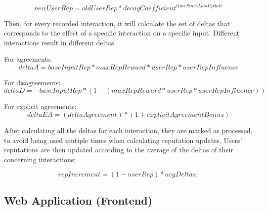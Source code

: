 \begin{equation}
    newUserRep = oldUserRep * decayCoefficient^{timeSinceLastUpdate}
\end{equation}

Then, for every recorded interaction, it will calculate the set of deltas that corresponds to the effect of a specific interaction on a specific input. Different interactions result in different deltas.

For agreements:
\begin{equation}
    deltaA = baseInputRep * maxRepReward * userRep * userRepInfluence
\end{equation}

For disagreements:
\begin{equation}
    deltaD = -baseInputRep * (1 - (maxRepReward * userRep * userRepInfluence))
\end{equation}

For explicit agreements:
\begin{equation}
    deltaEA = (deltaAgreement) * (1 + explicitAgreementBonus)
\end{equation}

After calculating all the deltas for each interaction, they are marked as processed, to avoid being used mutiple times when calculating reputation updates. Users' reputations are then updated according to the average of the deltas of their concerning interactions:

\begin{equation}
    repIncrement = (1 - userRep) * avgDeltas;
\end{equation}


\subsection{Web Application (Frontend)}

